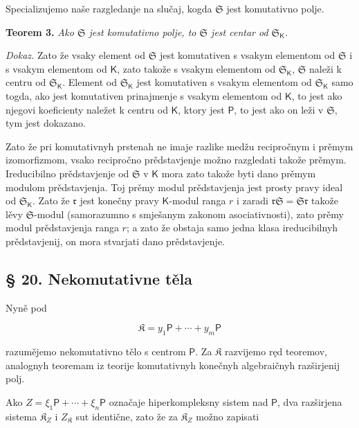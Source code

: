 \documentclass[11pt]{article}
\begin{document}
Specializujemo naše razgledanje na slučaj, kogda \(\mathfrak S\) jest komutativno polje.

\textbf{Teorem 3.} \emph{Ako \(\mathfrak S\) jest komutativno polje, to \(\mathfrak S\) jest centar od \(\mathfrak S_{\mathsf K}\).}

\emph{Dokaz.} Zato že vsaky element od \(\mathfrak S\) jest komutativen s vsakym elementom od \(\mathfrak S\) i s vsakym elementom od \(\mathsf K\), zato takože s vsakym elementom od \(\mathfrak S_{\mathsf K}\), \(\mathfrak S\) naleži k centru od \(\mathfrak S_{\mathsf K}\). Element od \(\mathfrak S_{\mathsf K}\) jest komutativen s vsakym elementom od \(\mathfrak S_{\mathsf K}\) samo togda, ako jest komutativen prinajmenje s vsakym elementom od \(\mathsf K\), to jest ako njegovi koeficienty naležet k centru od \(\mathsf K\), ktory jest \(\mathsf P\), to jest ako on leži v \(\mathfrak S\), tym jest dokazano.

Zato že pri komutativnyh prstenah ne imaje razlike medžu recipročnym i prěmym izomorfizmom, vsako recipročno prědstavjenje možno razgledati takože prěmym. Ireducibilno prědstavjenje od \(\mathfrak S\) v \(\mathsf K\) mora zato takože byti dano prěmym modulom prědstavjenja. Toj prěmy modul prědstavjenja jest prosty pravy ideal od \(\mathfrak S_{\mathsf K}\). Zato že \(\mathfrak r\) jest konečny pravy \(\mathsf K\)-modul ranga \(r\) i zaradi \(\mathfrak r\mathfrak S=\mathfrak S\mathfrak r\) takože lěvy \(\mathfrak S\)-modul (samorazumno s smješanym zakonom asociativnosti), zato prěmy modul prědstavjenja ranga \(r\); a zato že obstaja samo jedna klasa ireducibilnyh prědstavjenij, on mora stvarjati dano prědstavjenje.

\subsection*{§ 20. Nekomutativne těla}\label{nichtkommutative-koerper}

Nyně pod

\[
\mathfrak K=y_1\mathsf P+\cdots+y_m\mathsf P
\]

razumějemo nekomutativno tělo s centrom \(\mathsf P\). Za \(\mathfrak K\) razvijemo ręd teoremov, analognyh teoremam iz teorije komutativnyh konečnyh algebraičnyh razširjenij polj.

Ako \(Z=\xi_1\mathsf P+\cdots+\xi_n\mathsf P\) označaje hiperkompleksny sistem nad \(\mathsf P\), dva razširjena sistema \(\mathfrak K_Z\) i \(Z_{\mathfrak K}\) sut identične, zato že za \(\mathfrak K_Z\) možno zapisati
\end{document}

